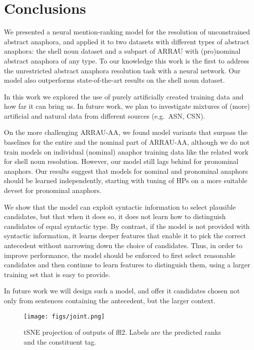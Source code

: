 \documentclass[11pt,letterpaper]{article}
\begin{document}
%
 	\section{Conclusions}


We presented a neural mention-ranking model for the resolution of unconstrained abstract anaphora, and applied it to two datasets with different types of abstract anaphora: the shell noun dataset and a subpart of ARRAU with (pro)nominal abstract anaphora of any type.
To our knowledge this work is the first to address the unrestricted abstract anaphora resolution task with a neural network. Our model also outperforms state-of-the-art results on the shell noun dataset. 

In this work we explored the use of purely artificially created training data and how far it can bring us. 
In future work, we plan to
investigate mixtures of (more) artificial and natural data from different sources (e.g.\ ASN, CSN). 

On the more challenging ARRAU-AA, we found model variants that surpass the baselines for the entire and the nominal part of ARRAU-AA, although we do not train models on individual (nominal) anaphor training data like the related work for shell noun resolution. However, our model still lags behind for pronominal anaphors. Our results suggest that models for nominal and pronominal anaphors should be learned independently, starting with tuning of HPs on a more suitable devset for pronominal anaphors. 

We show that the model can exploit syntactic information to select plausible candidates, but that when it does so, it does not learn how to distinguish candidates of equal syntactic type.
By contrast, if the model is not provided with syntactic information, 
it learns deeper features that enable it to pick the correct antecedent without narrowing down the choice of candidates. Thus, in order to improve performance, the model should be enforced to first select reasonable candidates and then continue to learn features to distinguish them, using a larger training set that is easy to provide.

In future work we will design such a model, and offer it candidates chosen not only from sentences containing the antecedent, but the larger context.

\begin{figure}[t]
	\centering
	\texttt{[image: figs/joint.png]}
	\caption{tSNE projection of outputs of ffl2. Labels are the predicted ranks and the constituent tag.}
	\label{fig:tsne}
	\vspace*{-3mm}
\end{figure}
\end{document}
